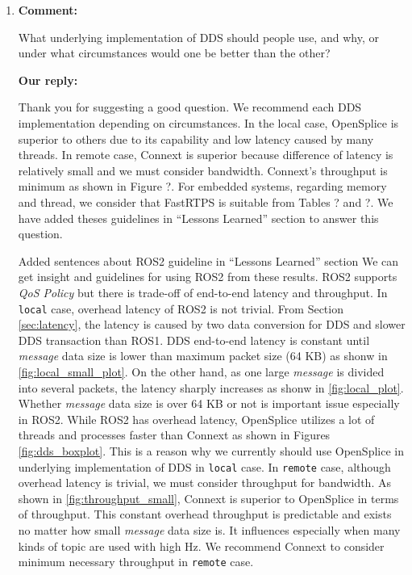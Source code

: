 \documentclass{article}
\begin{document}
\begin{enumerate}
\item \begin{flushleft}
    \textbf{Comment:}
  \end{flushleft}
  What underlying implementation of DDS should people use, and why, or under what circumstances would one be better than the other? 

  \begin{flushleft}
    \textbf{Our reply:}
  \end{flushleft}
  Thank you for suggesting a good question.
  We recommend each DDS implementation depending on circumstances.
  In the local case, OpenSplice is superior to others due to its capability and low latency caused by many threads.
  In remote case, Connext is superior because difference of latency is relatively small and we must consider bandwidth.
  Connext's throughput is minimum as shown in Figure ?.
  For embedded systems, regarding memory and thread, we consider that FastRTPS is suitable from Tables ? and ?.
  We have added theses guidelines in ``Lessons Learned'' section to answer this question.
  \begin{itembox}[|]{Added sentences about ROS2 guideline in ``Lessons Learned'' section}
    We can get insight and guidelines for using ROS2 from these results.
    ROS2 supports \emph{QoS Policy} but there is trade-off of end-to-end latency and throughput.
    In \texttt{local} case, overhead latency of ROS2 is not trivial.
    From Section \ref{sec:latency}, the latency is caused by two data conversion for DDS and slower DDS transaction than ROS1.
    DDS end-to-end latency is constant until \emph{message} data size is lower than maximum packet size (64 KB) as shonw in \ref{fig:local_small_plot}.
    On the other hand, as one large \emph{message} is divided into several packets, the latency sharply increases as shonw in \ref{fig:local_plot}.
    Whether \emph{message} data size is over 64 KB or not is important issue especially in ROS2.
    While ROS2 has overhead latency, OpenSplice utilizes a lot of threads and processes faster than Connext as shown in Figures \ref{fig:dds_boxplot}.
    This is a reason why we currently should use OpenSplice in underlying implementation of DDS in \texttt{local} case.
    In \texttt{remote} case, although overhead latency is trivial, we must consider throughput for bandwidth.
    As shown in \ref{fig:throughput_small}, Connext is superior to OpenSplice in terms of throughput.
    This constant overhead throughput is predictable and exists no matter how small \emph{message} data size is.
    It influences especially when many kinds of topic are used with high Hz.
    We recommend Connext to consider minimum necessary throughput in \texttt{remote} case.
  \end{itembox}\\


\end{enumerate}
\end{document}
